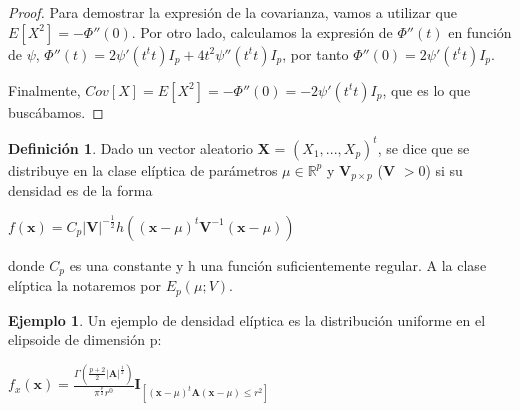 \documentclass{article}
\theoremstyle{theorem-style}  %
\theoremstyle{definition}
\newtheorem{definition}{Definición}[section]
\theoremstyle{example-style}
\newtheorem{example}{Ejemplo}[section]
\begin{document}
\begin{proof}
	Para demostrar la expresión de la covarianza, vamos a utilizar que $E[X^2] = - \Phi''(0)$. Por otro lado, calculamos la expresión de $\Phi''(t)$ en función de $\psi$, $\Phi''(t) = 2 \psi ' (t^tt)I_p + 4 t^2 \psi''(t^t t)I_p$, por tanto $\Phi''(0) = 2 \psi'(t^t t) I_p$.
	
	Finalmente, $Cov[X] = E[X^2] = - \Phi''(0) = - 2 \psi'(t^t t) I_p$, que es lo que buscábamos.
	
	\end{proof}

	\begin{definition}
		Dado un vector aleatorio \textbf{X} = $(X_1, ..., X_p)^t$, se dice que se distribuye en la clase elíptica de parámetros $\mu \in \mathbb{R}^p$ y \textbf{V}$_{p \times p}$ (\textbf{V} $> 0$) si su densidad es de la forma
		
		\begin{center}
		\begin{math}
			f(\textbf{x}) = C_p|\textbf{V}|^{-\frac{1}{2}}h((\textbf{x}-\mu)^t\textbf{V}^{-1}(\textbf{x}-\mu))
		\end{math}
		\end{center}
		donde $C_p$ es una constante y h una función suficientemente regular. A la clase elíptica la notaremos por $E_p(\mu; V)$.
	\end{definition}

	\begin{example}
		Un ejemplo de densidad elíptica es la distribución uniforme en el elipsoide de dimensión p:
		
		\begin{center}
			\begin{math}
				f_x(\textbf{x}) = \frac{\Gamma(\frac{p+2}{2}|\textbf{A}|^\frac{1}{2})}{\pi^\frac{p}{2}r^0}\textbf{I}_{[(\textbf{x}-\mu)^t\textbf{A}(\textbf{x}-\mu)\leq r^2]}
			\end{math}
		\end{center}

	\end{example}
\end{document}
